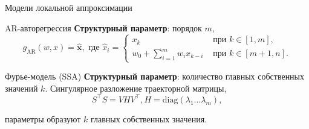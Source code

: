 \documentclass{beamer}
\newcommand{\bx}{\mathbf{x}}
\newcommand{\R}{\mathbb{R}}
\begin{document}
\begin{frame}{Модели локальной аппроксимации}
    \begin{block}{AR-авторегрессия}
        \textbf{Структурный параметр}: порядок $m$,
        $$
        g_{\text{AR}}(w, x) = \hat{\bx}, \text{ где }
        \hat{x}_i = \begin{cases}
            x_k & \text{ при } k \in [1, m], \\
            w_0 + \sum_{i=1}^m w_i x_{k - i} & \text{ при } k \in [m + 1, n].
        \end{cases}
        $$
    \end{block}


\begin{block}{Фурье-модель (SSA)}
    \textbf{Структурный параметр}: количество главных собственных значений $k$.
    Сингулярное разложение траекторной матрицы,
    $$
    S^\intercal S = VHV^\intercal, H = \mathrm{diag}(\lambda_1 \ldots \lambda_m),
    $$

    параметры образуют $k$ главных собственных значения.
\end{block}
\end{frame}

\end{document}
